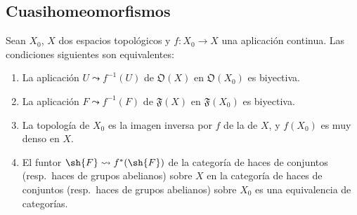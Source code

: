 \subsection{Cuasihomeomorfismos}
\label{subsection:IV.10.2}

\begin{proposition}[10.2.1]
\label{IV.10.2.1}
Sean $X_0$, $X$ dos espacios topológicos y $f:X_0\to X$ una aplicación continua.
Las condiciones siguientes son equivalentes:
\begin{enumerate}[label=\emph{\alph*)}]
  \item La aplicación $U\leadsto f^{-1}(U)$ de $\mathfrak{O}(X)$ en $\mathfrak{O}(X_0)$ es biyectiva.
  \item[\rm a$'$)] La aplicación $F\leadsto f^{-1}(F)$ de $\mathfrak{F}(X)$ en $\mathfrak{F}(X_0)$ es biyectiva.
  \item La topología de $X_0$ es la imagen inversa por $f$ de la de $X$, y $f(X_0)$ es muy denso  en $X$.
  \item El funtor $\sh{F}\leadsto f^*(\sh{F})$ de la categoría de haces de conjuntos (\textup{resp.}\ haces de grupos abelianos) sobre $X$ en la categoría de haces de conjuntos (\textup{resp.}\ haces de grupos abelianos) sobre $X_0$ es una equivalencia de categorías.
\end{enumerate}
\end{proposition}


